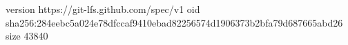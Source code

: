 version https://git-lfs.github.com/spec/v1
oid sha256:284eebc5a024e78dfccaf9410ebad82256574d1906373b2bfa79d687665abd26
size 43840
